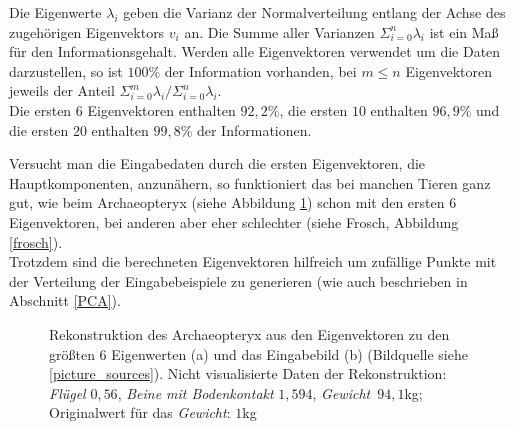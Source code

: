  Die Eigenwerte $\lambda_i$ geben die Varianz der Normalverteilung entlang der Achse des zugehörigen Eigenvektors $v_i$ an. Die Summe aller Varianzen $\Sigma_{i=0}^n \lambda_i$ ist ein Maß für den Informationsgehalt. Werden alle Eigenvektoren verwendet um die Daten darzustellen, so ist $100\%$ der Information vorhanden, bei $m \le n$ Eigenvektoren jeweils der Anteil $\Sigma_{i=0}^m \lambda_i / \Sigma_{i=0}^n \lambda_i$.\\
 Die ersten $6$ Eigenvektoren enthalten $92{,}2\%$, die ersten $10$ enthalten $96{,}9\%$ und die ersten $20$ enthalten $99{,}8\%$ der Informationen.
 
 Versucht man die Eingabedaten durch die ersten Eigenvektoren, \bzw die Hauptkomponenten, anzunähern, so funktioniert das bei manchen Tieren ganz gut, wie \zb beim \mbox{Archaeopteryx} (siehe Abbildung \ref{archaeopteryx}) schon mit den ersten $6$ Eigenvektoren, bei anderen aber eher schlechter (siehe Frosch, Abbildung \ref{frosch}).\\
 Trotzdem sind die berechneten Eigenvektoren hilfreich um zufällige Punkte mit der Verteilung der Eingabebeispiele zu generieren (wie auch beschrieben in Abschnitt \ref{PCA}).
 
 \begin{figure}
  \centering
  \qquad
  
  \caption{Rekonstruktion des Archaeopteryx aus den Eigenvektoren zu den größten $6$ Eigenwerten (a) und das Eingabebild (b) (Bildquelle siehe \ref{picture_sources}). Nicht visualisierte Daten der Rekonstruktion: \emph{Flügel} $0{,}56$, \emph{Beine mit Bodenkontakt} $1{,}594$, \emph{Gewicht}~$94{,}1$kg; Originalwert für das \emph{Gewicht}: $1$kg}
  \label{archaeopteryx}
 \end{figure}
 
